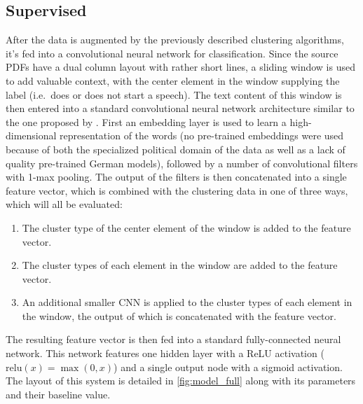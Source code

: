 \subsection{Supervised}%
\label{sec:sup}
After the data is augmented by the previously described clustering algorithms,
it's fed into a convolutional neural network for classification. Since the
source PDFs have a dual column layout with rather short lines, a sliding window
is used to add valuable context, with the center element in the window supplying
the label (i.e.\ does or does not start a speech). The text content of this
window is then entered into a standard convolutional neural network architecture
similar to the one proposed by \textcite{kim2014conv}.  First an embedding layer
is used to learn a high-dimensional representation of the words (no pre-trained
embeddings were used because of both the specialized political domain of the
data as well as a lack of quality pre-trained German models), followed by a
number of convolutional filters with 1-max pooling. The output of the filters is
then concatenated into a single feature vector, which is combined with the
clustering data in one of three ways, which will all be evaluated:
\begin{enumerate}
  \item The cluster type of the center element of the window is added to the
    feature vector.
  \item The cluster types of each element in the window are added to the
    feature vector.
  \item An additional smaller CNN is applied to the cluster types of each
    element in the window, the output of which is concatenated with the feature
    vector.
\end{enumerate}
The resulting feature vector is then fed into a standard fully-connected neural
network. This network features one hidden layer with a ReLU activation
($\mathrm{relu}(x) = \max(0, x)$) and a single output node with a sigmoid
activation. The layout of this system is detailed in \cref{fig:model_full} along
with its parameters and their baseline value.

